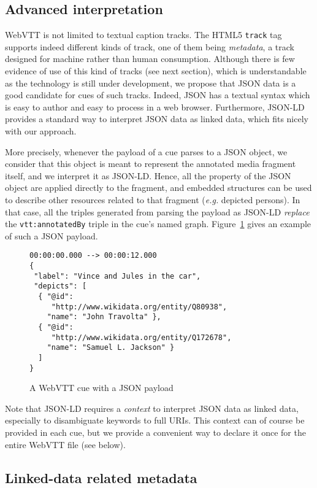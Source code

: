 \documentclass{sig-alternate}
\newcommand{\vtt}[1]{\texttt{vtt:#1}}
\begin{document}
\subsection{Advanced interpretation}

WebVTT is not limited to textual caption tracks.
The HTML5 \texttt{track} tag supports indeed different kinds of track,
one of them being \textit{metadata},
a track designed for machine rather than human consumption.
Although there is few evidence of use of this kind of tracks (see next section),
which is understandable as the technology is still under development,
we propose that JSON data is a good candidate for cues of such tracks.
Indeed, JSON has a textual syntax which is easy to author
and easy to process in a web browser.
Furthermore, JSON-LD~\cite{sporny2013jsonld} provides
a standard way to interpret JSON data as linked data,
which fits nicely with our approach.

More precisely, whenever the payload of a cue parses to a JSON object,
we consider that this object is meant to represent the annotated media fragment itself,
and we interpret it as JSON-LD.
Hence, all the property of the JSON object are applied directly to the fragment,
and embedded structures can be used to describe other resources related to that fragment
(\textit{e.g.} depicted persons).
In that case, all the triples generated from parsing the payload as JSON-LD
\emph{replace} the \vtt{annotatedBy} triple in the cue's named graph.
Figure~\ref{fig:json-payload} gives an example of such a JSON payload.

\begin{figure}
\begin{verbatim}
00:00:00.000 --> 00:00:12.000
{
 "label": "Vince and Jules in the car",
 "depicts": [
  { "@id":
     "http://www.wikidata.org/entity/Q80938",
    "name": "John Travolta" },
  { "@id":
     "http://www.wikidata.org/entity/Q172678",
    "name": "Samuel L. Jackson" }
  ]
}
\end{verbatim}
\label{fig:json-payload}
\caption{A WebVTT cue with a JSON payload}
\end{figure}

Note that JSON-LD requires a \emph{context} to interpret JSON data as linked data,
especially to disambiguate keywords to full URIs.
This context can of course be provided in each cue,
but we provide a convenient way to declare it once for the entire WebVTT file (see below).

\subsection{Linked-data related metadata}
\end{document}
